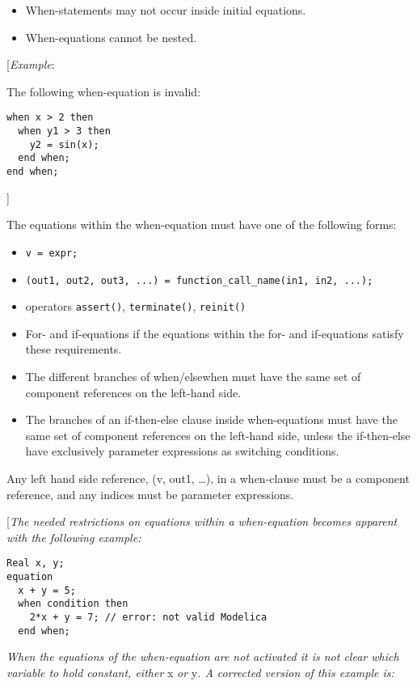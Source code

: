 \begin{itemize}
\item
  When-statements may not occur inside initial equations.
\item
  When-equations cannot be nested.
\end{itemize}

{[}\emph{Example}:

The following when-equation is invalid:
\begin{lstlisting}[language=modelica]
when x > 2 then
  when y1 > 3 then
    y2 = sin(x);
  end when;
end when; 
\end{lstlisting}

{]}

The equations within the when-equation must have one of the following
forms:

\begin{itemize}
\item \lstinline!v = expr;!
\item \lstinline!(out1, out2, out3, ...) = function_call_name(in1, in2, ...);!
\item
  operators \lstinline!assert()!, \lstinline!terminate()!, \lstinline!reinit()!
\item
  For- and if-equations if the equations within the for- and
  if-equations satisfy these requirements.
\item
  The different branches of when/elsewhen must have the same set of
  component references on the left-hand side.
\item
  The branches of an if-then-else clause inside when-equations must have
  the same set of component references on the left-hand side, unless the
  if-then-else have exclusively parameter expressions as switching
  conditions.
\end{itemize}

Any left hand side reference, (v, out1, \ldots{}), in a when-clause must
be a component reference, and any indices must be parameter expressions.

{[}\emph{The needed restrictions on equations within a when-equation
becomes apparent with the following example: }

\begin{lstlisting}[language=modelica]
  Real x, y;
equation
  x + y = 5;
  when condition then
    2*x + y = 7; // error: not valid Modelica
  end when;
\end{lstlisting}

\emph{When the equations of the when-equation are not activated it is
not clear which variable to hold constant, either} x \emph{or} y\emph{.
A corrected version of this example is: }

